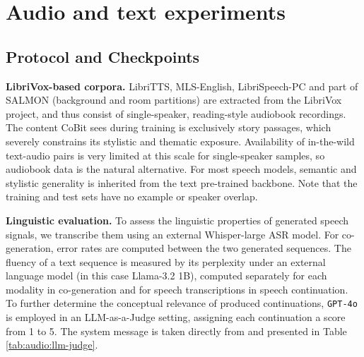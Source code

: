 \fi

\section{Audio and text experiments}
\label{app:audio}

\subsection{Protocol and Checkpoints} \label{app:audio:protocol}

\textbf{LibriVox-based corpora.} LibriTTS, MLS-English, LibriSpeech-PC and part of SALMON (background and room partitions) are extracted from the LibriVox project, and thus consist of single-speaker, reading-style audiobook recordings. The content CoBit sees during training is exclusively story passages, which severely constrains its stylistic and thematic exposure. Availability of in-the-wild text-audio pairs is very limited at this scale for single-speaker samples, so audiobook data is the natural alternative. For most speech models, semantic and stylistic generality is inherited from the text pre-trained backbone. Note that the training and test sets have no example or speaker overlap. 

\textbf{Linguistic evaluation.} To assess the linguistic properties of generated speech signals, we transcribe them using an external Whisper-large \citep{audio:whisper} ASR model. For co-generation, error rates are computed between the two generated sequences. The fluency of a text sequence is measured by its perplexity under an external language model (in this case Llama-3.2 1B), computed separately for each modality in co-generation and for speech transcriptions in speech continuation. To further determine the conceptual relevance of produced continuations, \texttt{GPT-4o} is employed in an LLM-as-a-Judge setting, assigning each continuation a score from 1 to 5. The system message is taken directly from \cite{audio:taste} and presented in Table \ref{tab:audio:llm-judge}.

